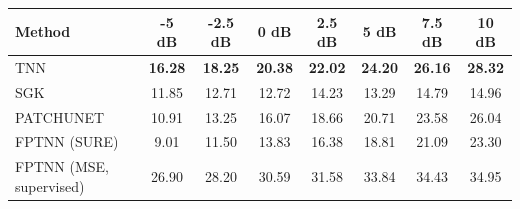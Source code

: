 \begin{tabular}{lccccccc}
\hline
Method & -5 dB & -2.5 dB & 0 dB & 2.5 dB & 5 dB & 7.5 dB & 10 dB \\
\hline
TNN & \textbf{16.28} & \textbf{18.25} & \textbf{20.38} & \textbf{22.02} & \textbf{24.20} & \textbf{26.16} & \textbf{28.32} \\
SGK & 11.85 & 12.71 & 12.72 & 14.23 & 13.29 & 14.79 & 14.96 \\
PATCHUNET & 10.91 & 13.25 & 16.07 & 18.66 & 20.71 & 23.58 & 26.04 \\
FPTNN (SURE) & 9.01 & 11.50 & 13.83 & 16.38 & 18.81 & 21.09 & 23.30 \\
FPTNN (MSE, supervised) & 26.90 & 28.20 & 30.59 & 31.58 & 33.84 & 34.43 & 34.95 \\
\hline
\end{tabular}
